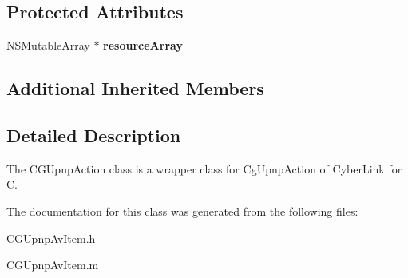 \subsection*{Protected Attributes}
\begin{DoxyCompactItemize}
\item 
\hypertarget{interface_c_g_upnp_av_item_a5bce3c530122edf243a912e52d9e71a3}{N\-S\-Mutable\-Array $\ast$ {\bfseries resource\-Array}}\label{interface_c_g_upnp_av_item_a5bce3c530122edf243a912e52d9e71a3}

\end{DoxyCompactItemize}
\subsection*{Additional Inherited Members}


\subsection{Detailed Description}
The C\-G\-Upnp\-Action class is a wrapper class for Cg\-Upnp\-Action of Cyber\-Link for C. 

The documentation for this class was generated from the following files\-:\begin{DoxyCompactItemize}
\item 
C\-G\-Upnp\-Av\-Item.\-h\item 
C\-G\-Upnp\-Av\-Item.\-m\end{DoxyCompactItemize}
